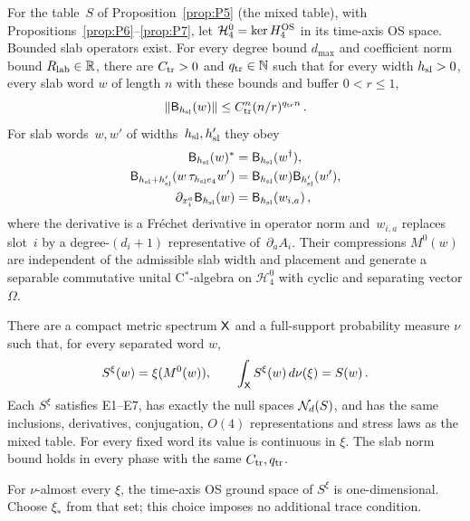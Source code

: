 \begin{proposition}\label{prop:P8}
For the table~$S$ of Proposition~\ref{prop:P5} (the mixed table), with Propositions~\ref{prop:P6}--\ref{prop:P7}, let $\mathcal H^0_4=\ker H^{\rm OS}_4$ in its time-axis OS space. Bounded slab operators exist. For every degree bound $d_{\max}$ and coefficient norm bound $R_{\rm lab}\in\mathbb{R}$, there are $C_{\rm tr}>0$ and $q_{\rm tr}\in\mathbb{N}$ such that for every width $h_{\rm sl}>0$, every slab word $w$ of length $n$ with these bounds and buffer $0<r\le1$,
\begin{equation}\label{eq:P8-1}
\|\mathsf B_{h_{\rm sl}}(w)\|\le C_{\rm tr}^n(n/r)^{q_{\rm tr}n}\,.
\end{equation}
For slab words~$w,w'$ of widths~$h_{\rm sl},h'_{\rm sl}$ they obey
\begin{equation}\label{eq:P8-laws}
\begin{aligned}
\mathsf B_{h_{\rm sl}}(w)^*&=\mathsf B_{h_{\rm sl}}(w^\dagger),\\
\mathsf B_{h_{\rm sl}+h'_{\rm sl}}(w\,\tau_{h_{\rm sl}e_4}w')&=\mathsf B_{h_{\rm sl}}(w)\mathsf B_{h'_{\rm sl}}(w'),\\
\partial_{x_i^a}\mathsf B_{h_{\rm sl}}(w)&=\mathsf B_{h_{\rm sl}}(w_{i,a})\,,
\end{aligned}
\end{equation}
where the derivative is a Fr\'echet derivative in operator norm and~$w_{i,a}$ replaces slot~$i$ by a degree-$(d_i+1)$ representative of~$\partial_aA_i$. Their compressions $M^0(w)$ are independent of the admissible slab width and placement and generate a separable commutative unital C$^*$-algebra on $\mathcal H^0_4$ with cyclic and separating vector $\Omega$.

There are a compact metric spectrum $\mathsf{X}$ and a full-support probability measure $\nu$ such that, for every separated word $w$,
\begin{equation}\label{eq:P8-2}
S^\xi(w)=\xi(M^0(w)),\qquad \int_{\mathsf{X}} S^\xi(w)\,d\nu(\xi)=S(w)\,.
\end{equation}
Each $S^\xi$ satisfies E1–E7, has exactly the null spaces $\mathcal{N}_{d}(S)$, and has the same inclusions, derivatives, conjugation, $O(4)$ representations and stress laws as the mixed table. For every fixed word its value is continuous in $\xi$. The slab norm bound holds in every phase with the same $C_{\rm tr},q_{\rm tr}$.

For $\nu$-almost every $\xi$, the time-axis OS ground space of $S^\xi$ is one-dimensional. Choose $\xi_*$ from that set; this choice imposes no additional trace condition.
\end{proposition}

